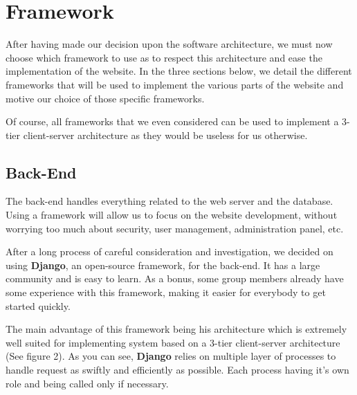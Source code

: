 \section{Framework}

After having made our decision upon the software architecture, we must now
choose which framework to use as to respect this architecture and ease the
implementation of the website. In the three sections below, we detail the
different frameworks that will be used to implement the various parts of
the website and motive our choice of those specific frameworks. \newline

Of course, all frameworks that we even considered can be used to implement
a 3-tier client-server architecture as they would be useless for us
otherwise.

\subsection{Back-End}

The back-end handles everything related to the web server and the database.
Using a framework will allow us to focus on the website development,
without worrying too much about security, user management, administration
panel, etc.\newline

After a long process of careful consideration and investigation, we decided
on using \textbf{Django}, an open-source framework, for the back-end. It
has a large community and is easy to learn. As a bonus, some group members
already have some experience with this framework, making it easier for
everybody to get started quickly.\newline

The main advantage of this framework being his architecture which is
extremely well suited for implementing system based on a 3-tier
client-server architecture (See figure 2). As you can see, \textbf{Django}
relies on multiple layer of processes to handle request as swiftly and
efficiently as possible. Each process having it's own role and being called
only if necessary.  \newline


